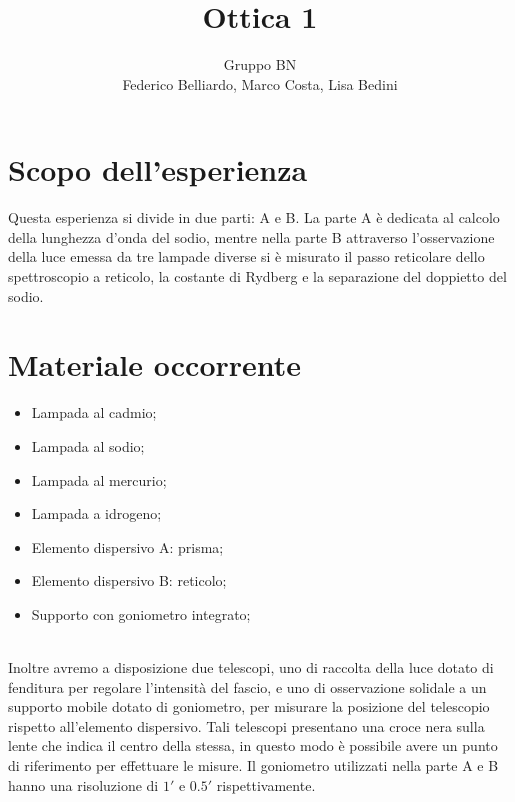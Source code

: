 \documentclass[10pt,a4paper]{article}
\author{Gruppo BN \\ Federico Belliardo, Marco Costa, Lisa Bedini}
\title{Ottica 1}
\begin{document}
\maketitle
\section{Scopo dell'esperienza}
Questa esperienza si divide in due parti: A e B.
La parte A è dedicata al calcolo della lunghezza d'onda del sodio, mentre nella parte B attraverso l'osservazione della luce emessa da tre lampade diverse si è misurato il passo reticolare dello spettroscopio a reticolo, la costante di Rydberg e la separazione del doppietto del sodio.

\section{Materiale occorrente}
\begin{itemize}
\item Lampada al cadmio;
\item Lampada al sodio;
\item Lampada al mercurio;
\item Lampada a idrogeno;
\item Elemento dispersivo A: prisma;
\item Elemento dispersivo B: reticolo;
\item Supporto con goniometro integrato;
\end{itemize}
\\
Inoltre avremo a disposizione due telescopi, uno di raccolta della luce dotato di fenditura per regolare l'intensità del fascio, e uno di osservazione solidale a un supporto mobile dotato di goniometro, per misurare la posizione del telescopio rispetto all'elemento dispersivo. Tali telescopi presentano una croce nera sulla lente che indica il centro della stessa, in questo modo è possibile avere un punto di riferimento per effettuare le misure.
Il goniometro utilizzati nella parte A e B hanno una risoluzione di $1'$ e $0.5 '$ rispettivamente.
\end{document}
